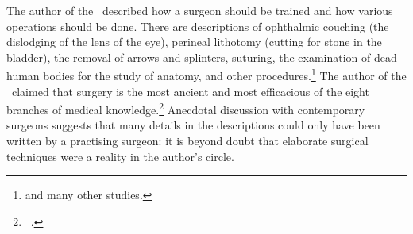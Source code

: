 
The author of the \SS\ described how a surgeon should be trained and how various
operations should be done.  There are descriptions of ophthalmic couching (the
dislodging of the lens of the eye), perineal lithotomy (cutting for stone in the
bladder), the removal of arrows and splinters, suturing, the examination of dead
human bodies for the study of anatomy, and other
procedures.\footnote{\cites{mukh-1913,desh-2000,nara-2011,wuja-2003,wils-1823}
 and
many other studies.} The author of the \SS\ claimed that surgery is the most ancient
and most efficacious of the eight branches of medical knowledge.\footnote{\SS\
.} Anecdotal discussion with contemporary surgeons suggests 
that many details in the descriptions could only have been written by a practising
surgeon: it is beyond doubt that elaborate surgical techniques were a reality in
the author's circle. %


%

